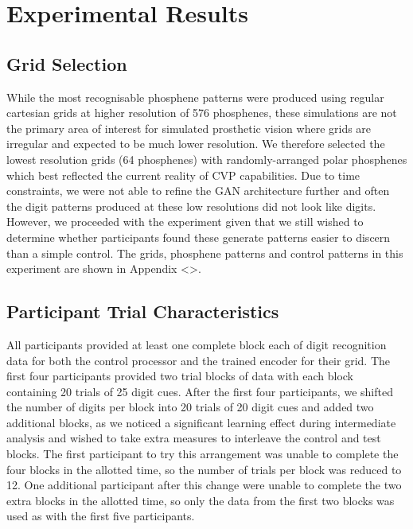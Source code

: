 \documentclass[a4paper,11pt,openany]{book}
\begin{document}
\chapter{Experimental Results}
\label{sec:orgf6b54b9}

\section*{Grid Selection}
\label{sec:org6f657b1}

While the most recognisable phosphene patterns were produced using regular cartesian grids at higher resolution of 576 phosphenes, these simulations are not the primary area of interest for simulated prosthetic vision where grids are irregular and expected to be much lower resolution.
We therefore selected the lowest resolution grids (64 phosphenes) with randomly-arranged polar phosphenes which best reflected the current reality of CVP capabilities.
Due to time constraints, we were not able to refine the GAN architecture further and often the digit patterns produced at these low resolutions did not look like digits.
However, we proceeded with the experiment given that we still wished to determine whether participants found these generate patterns easier to discern than a simple control.
The grids, phosphene patterns and control patterns in this experiment are shown in Appendix <>.

\section*{Participant Trial Characteristics}
\label{sec:orgd9ad76c}

All participants provided at least one complete block each of digit recognition data for both the control processor and the trained encoder for their grid.
The first four participants provided two trial blocks of data with each block containing 20 trials of 25 digit cues.
After the first four participants, we shifted the number of digits per block into 20 trials of 20 digit cues and added two additional blocks, as we noticed a significant learning effect during intermediate analysis and wished to take extra measures to interleave the control and test blocks.
The first participant to try this arrangement was unable to complete the four blocks in the allotted time, so the number of trials per block was reduced to 12.
One additional participant after this change were unable to complete the two extra blocks in the allotted time, so only the data from the first two blocks was used as with the first five participants.
\end{document}
